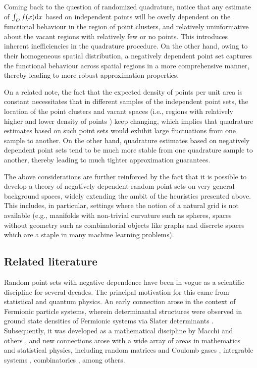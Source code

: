 Coming back to the question of randomized quadrature, notice that any estimate of $\int_D f(x) \mathrm{d} x$ based on independent points will be overly dependent on the functional behaviour in the region of point clusters, and relatively uninformative about the vacant regions with relatively few or no points. This introduces inherent inefficiencies in the quadrature procedure. On the other hand, owing to their homogeneous spatial distribution, a negatively dependent point set captures the functional behaviour across spatial regions in a more comprehensive manner, thereby leading to more robust approximation properties. 

On a related note, the fact that the expected density of points per unit area is constant necessitates that in different samples of the independent point sets, the location of the point clusters and vacant spaces (i.e., regions with relatively higher and lower density of points ) keep changing, which implies that quadrature estimates based on such point sets would exhibit large fluctuations from one sample to another. On the other hand, quadrature estimates based on negatively dependent point sets tend to be much more stable from one quadrature sample to another, thereby leading to much tighter approximation guarantees.

The above considerations are further reinforced by the fact that it is possible to develop a theory of negatively dependent random point sets on very general background spaces, widely extending the ambit of the heuristics presented above. This includes, in particular, settings where the notion of a natural grid is not available (e.g., manifolds with non-trivial curvature such as spheres, spaces without geometry such as combinatorial objects like graphs and discrete spaces which are a staple in many machine learning problems).

\subsection{Related literature}
Random point sets with negative dependence have been in vogue as a scientific discipline for several decades. The principal motivation for this came from statistical and quantum physics. An early connection arose in the context of Fermionic particle systems, wherein determinantal structures were observed in ground state densities of Fermionic systems via Slater determinants \cite{Slater}. Subsequently, it was developed as a mathematical discipline by Macchi and others \cite{Mac72, Mac75, SoshDPP}, and new connections arose with a wide array of areas in mathematics and statistical physics, including random matrices and Coulomb gases  \cite{johanssondpp, borodin}, integrable systems  \cite{Deift_1,Deift_2}, combinatorics \cite{borodin2015_integrable,borodin2016_integrable}, among others. 


